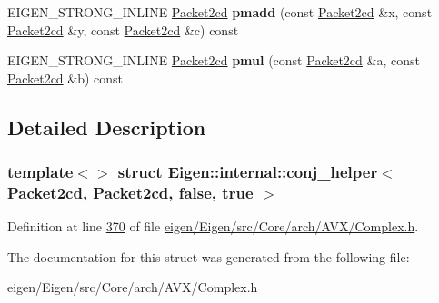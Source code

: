 \begin{DoxyCompactItemize}
E\+I\+G\+E\+N\+\_\+\+S\+T\+R\+O\+N\+G\+\_\+\+I\+N\+L\+I\+NE \hyperlink{struct_eigen_1_1internal_1_1_packet2cd}{Packet2cd} {\bfseries pmadd} (const \hyperlink{struct_eigen_1_1internal_1_1_packet2cd}{Packet2cd} \&x, const \hyperlink{struct_eigen_1_1internal_1_1_packet2cd}{Packet2cd} \&y, const \hyperlink{struct_eigen_1_1internal_1_1_packet2cd}{Packet2cd} \&c) const
\item 
\mbox{\label{struct_eigen_1_1internal_1_1conj__helper_3_01_packet2cd_00_01_packet2cd_00_01false_00_01true_01_4_a7467ccb1243cb2f7cbcd143fecb9824e}} 
E\+I\+G\+E\+N\+\_\+\+S\+T\+R\+O\+N\+G\+\_\+\+I\+N\+L\+I\+NE \hyperlink{struct_eigen_1_1internal_1_1_packet2cd}{Packet2cd} {\bfseries pmul} (const \hyperlink{struct_eigen_1_1internal_1_1_packet2cd}{Packet2cd} \&a, const \hyperlink{struct_eigen_1_1internal_1_1_packet2cd}{Packet2cd} \&b) const
\end{DoxyCompactItemize}


\subsection{Detailed Description}
\subsubsection*{template$<$$>$\newline
struct Eigen\+::internal\+::conj\+\_\+helper$<$ Packet2cd, Packet2cd, false, true $>$}



Definition at line \hyperlink{eigen_2_eigen_2src_2_core_2arch_2_a_v_x_2_complex_8h_source_l00370}{370} of file \hyperlink{eigen_2_eigen_2src_2_core_2arch_2_a_v_x_2_complex_8h_source}{eigen/\+Eigen/src/\+Core/arch/\+A\+V\+X/\+Complex.\+h}.



The documentation for this struct was generated from the following file\+:\begin{DoxyCompactItemize}
\item 
eigen/\+Eigen/src/\+Core/arch/\+A\+V\+X/\+Complex.\+h\end{DoxyCompactItemize}
